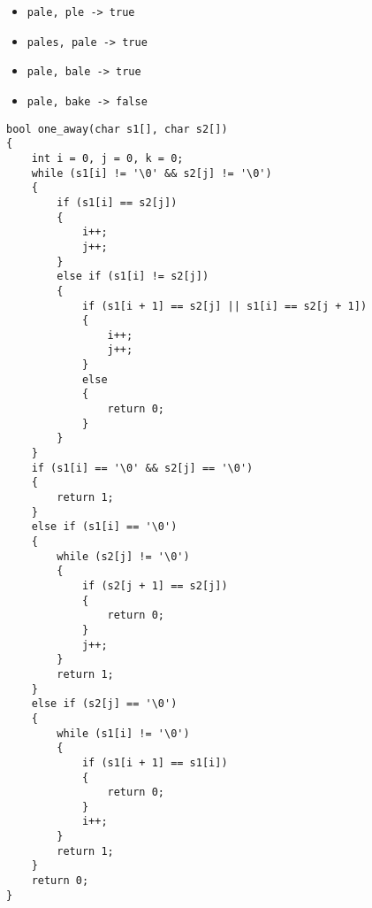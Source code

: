 \documentclass[french,a4paper,addpoints,11pt]{exam}
\begin{document}
\begin{questions}
\begin{itemize}
\item \texttt{pale, ple -> true}
\item \texttt{pales, pale -> true}
\item \texttt{pale, bale -> true}
\item \texttt{pale, bake -> false}
\end{itemize}

\ifprintanswers
\begin{solution}
\begin{lstlisting}
bool one_away(char s1[], char s2[])
{
    int i = 0, j = 0, k = 0;
    while (s1[i] != '\0' && s2[j] != '\0')
    {
        if (s1[i] == s2[j])
        {
            i++;
            j++;
        }
        else if (s1[i] != s2[j])
        {
            if (s1[i + 1] == s2[j] || s1[i] == s2[j + 1])
            {
                i++;
                j++;
            }
            else
            {
                return 0;
            }
        }
    }
    if (s1[i] == '\0' && s2[j] == '\0')
    {
        return 1;
    }
    else if (s1[i] == '\0')
    {
        while (s2[j] != '\0')
        {
            if (s2[j + 1] == s2[j])
            {
                return 0;
            }
            j++;
        }
        return 1;
    }
    else if (s2[j] == '\0')
    {
        while (s1[i] != '\0')
        {
            if (s1[i + 1] == s1[i])
            {
                return 0;
            }
            i++;
        }
        return 1;
    }
    return 0;
}
\end{lstlisting}
\end{solution}

\fi

\end{questions}
\end{document}
